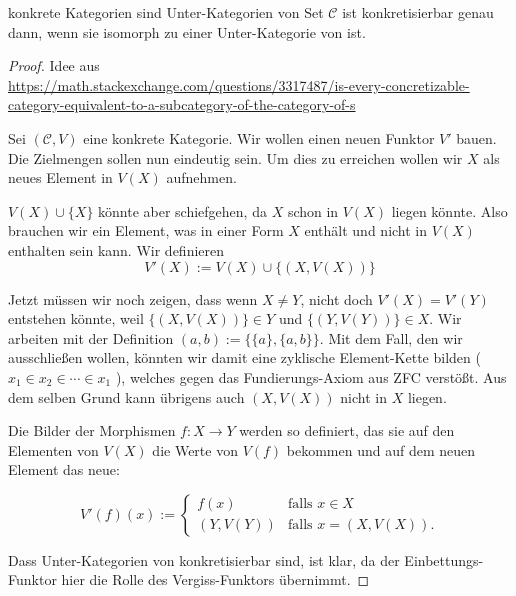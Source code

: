 \documentclass[a4paper]{amsart}
\theoremstyle{definition}
\newcommand{\CC}{\ensuremath{\mathcal{ C }}}
\newcommand{\Set}{\text{\textbf{Set}} }
\begin{document}
\begin{Satz}{konkrete Kategorien sind Unter-Kategorien von Set}
   $\CC$ ist konkretisierbar genau dann, wenn sie isomorph zu einer Unter-Kategorie von \Set ist. 
\end{Satz}
\begin{proof}
   Idee aus\\
   {\tiny\url{https://math.stackexchange.com/questions/3317487/is-every-concretizable-category-equivalent-to-a-subcategory-of-the-category-of-s}}
   
   Sei $(\CC, V)$ eine konkrete Kategorie. Wir wollen einen neuen Funktor $V'$ bauen. Die Zielmengen sollen nun eindeutig sein. Um dies zu erreichen wollen wir $X$ als neues Element in $V(X)$ aufnehmen. 
   
   $V(X) \cup \{X\}$ könnte aber schiefgehen, da $X$ schon in $V(X)$ liegen könnte. Also brauchen wir ein Element, was in einer Form $X$ enthält und nicht in $V(X)$ enthalten sein kann. Wir definieren
   \begin{equation}
      V'(X) := V(X) \cup \{ (X, V(X)) \}
   \end{equation}
   
   Jetzt müssen wir noch zeigen, dass wenn $X \ne Y$, nicht doch $V'(X) = V'(Y)$ entstehen könnte, weil $\{ (X, V(X)) \} \in Y$ und $\{ (Y, V(Y)) \} \in X$. Wir arbeiten mit der Definition $(a,b) := \{\{a\}, \{a, b\}\}$. Mit dem Fall, den wir ausschließen wollen, könnten wir damit eine zyklische Element-Kette bilden ($x_1 \in x_2 \in \cdots \in x_1$ ), welches gegen das Fundierungs-Axiom aus ZFC verstößt. Aus dem selben Grund kann übrigens auch $(X, V(X))$ nicht in $X$ liegen.
   
   Die Bilder der Morphismen $f \colon X \to Y$ werden so definiert, das sie auf den Elementen von $V(X)$ die Werte von $V(f)$ bekommen und auf dem neuen Element das neue:

   \begin{equation}
     V'(f)(x) := \begin{cases}
        f(x)      & \text{falls } x \in X\\
        (Y, V(Y)) & \text{falls } x = (X, V(X)).
     \end{cases}
   \end{equation}

   Dass Unter-Kategorien von \Set konkretisierbar sind, ist klar, da der Einbettungs-Funktor hier die Rolle des Vergiss-Funktors übernimmt. 
\end{proof}
\end{document}
